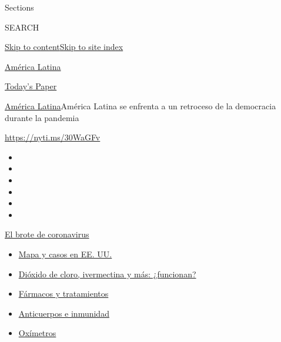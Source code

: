 Sections

SEARCH

\protect\hyperlink{site-content}{Skip to
content}\protect\hyperlink{site-index}{Skip to site index}

\href{https://www.nytimes3xbfgragh.onion/es/section/america-latina}{América
Latina}

\href{https://myaccount.nytimes3xbfgragh.onion/auth/login?response_type=cookie\&client_id=vi}{}

\href{https://www.nytimes3xbfgragh.onion/section/todayspaper}{Today's
Paper}

\href{/es/section/america-latina}{América Latina}\textbar{}América
Latina se enfrenta a un retroceso de la democracia durante la pandemia

\url{https://nyti.ms/30WaGFv}

\begin{itemize}
\item
\item
\item
\item
\item
\item
\end{itemize}

\href{https://www.nytimes3xbfgragh.onion/es/spotlight/coronavirus?action=click\&pgtype=Article\&state=default\&region=TOP_BANNER\&context=storylines_menu}{El
brote de coronavirus}

\begin{itemize}
\tightlist
\item
  \href{https://www.nytimes3xbfgragh.onion/es/interactive/2020/espanol/mundo/coronavirus-en-estados-unidos.html?action=click\&pgtype=Article\&state=default\&region=TOP_BANNER\&context=storylines_menu}{Mapa
  y casos en EE. UU.}
\item
  \href{https://www.nytimes3xbfgragh.onion/es/2020/07/23/espanol/america-latina/bolivia-cloro-coronavirus-ivermectina.html?action=click\&pgtype=Article\&state=default\&region=TOP_BANNER\&context=storylines_menu}{Dióxido
  de cloro, ivermectina y más: ¿funcionan?}
\item
  \href{https://www.nytimes3xbfgragh.onion/es/interactive/2020/science/coronavirus-tratamientos-curas.html?action=click\&pgtype=Article\&state=default\&region=TOP_BANNER\&context=storylines_menu}{Fármacos
  y tratamientos}
\item
  \href{https://www.nytimes3xbfgragh.onion/es/2020/07/28/espanol/ciencia-y-tecnologia/anticuerpos-coronavirus-inmunidad.html?action=click\&pgtype=Article\&state=default\&region=TOP_BANNER\&context=storylines_menu}{Anticuerpos
  e inmunidad}
\item
  \href{https://www.nytimes3xbfgragh.onion/es/2020/04/29/espanol/estilos-de-vida/oximetro-para-que-sirve.html?action=click\&pgtype=Article\&state=default\&region=TOP_BANNER\&context=storylines_menu}{Oxímetros}
\end{itemize}

